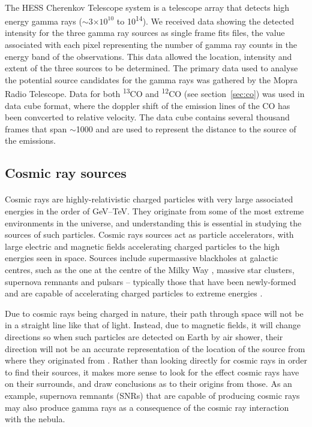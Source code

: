 \documentclass[a4paper, titlepage, oneside]{article}
\newcommand{\elem}[2]{\textsuperscript{#1}{#2}}
\newcommand{\e}[1]{\ensuremath{\times 10^{#1}}}
\begin{document}
\begin{multicols}{2}
\paragraph{} \label{sec:tel}
The HESS Cherenkov Telescope system is a telescope array that detects high energy gamma rays (\(\sim\)\(3\e{10}\) to \unit{10^{14}}{\electronvolt}). We received data showing the detected intensity for the three gamma ray sources as single frame fits files, the value associated with each pixel representing the number of gamma ray counts in the energy band of the observations. This data allowed the location, intensity and extent of the three sources to be determined. The primary data used to analyse the potential source candidates for the gamma rays was gathered by the Mopra Radio Telescope. Data for both \elem{13}{C}O and \elem{12}{C}O (see section~\ref{sec:co}) was used in data cube format, where the doppler shift of the emission lines of the CO has been convcerted to relative velocity. The data cube contains several thousand frames that span \(\sim\)\unit{1000}{\kilo\meter\cdot\reciprocal\second} and are used to represent the distance to the source of the emissions.

\subsection{Cosmic ray sources}
\paragraph{} \label{sec:cr}
Cosmic rays are highly-relativistic charged particles with very large associated energies in the order of GeV--TeV. They originate from some of the most extreme environments in the universe, and understanding this is essential in studying the sources of such particles. Cosmic rays sources act as particle accelerators, with large electric and magnetic fields accelerating charged particles to the high energies seen in space. Sources include supermassive blackholes at galactic centres, such as the one at the centre of the Milky Way \parencite{Guo:2013}, massive star clusters, supernova remnants \parencite{Vink:2013} and pulsars -- typically those that have been newly-formed and are capable of accelerating charged particles to extreme energies \parencite{Fang:2012}.

Due to cosmic rays being charged in nature, their path through space will not be in a straight line like that of light. Instead, due to magnetic fields, it will change directions so when such particles are detected on Earth by air shower, their direction will not be an accurate representation of the location of the source from where they originated from \parencite{Kalli:2011}. Rather than looking directly for cosmic rays in order to find their sources, it makes more sense to look for the effect cosmic rays have on their surrounds, and draw conclusions as to their origins from those. As an example, supernova remnants (SNRs) that are capable of producing cosmic rays may also produce gamma rays as a consequence of the cosmic ray interaction with the nebula.


\end{multicols}
\end{document}

